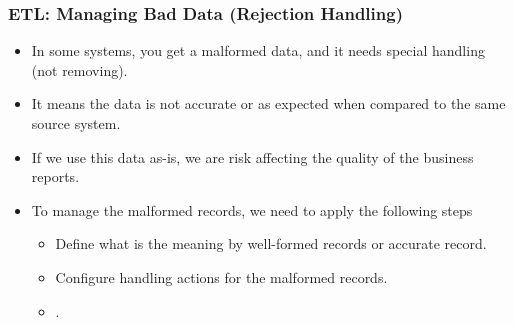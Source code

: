 
\begin{frame}
	\frametitle{ETL: Managing Bad Data (Rejection Handling)}
	\begin{itemize}[<+->]
		\item In some systems, you get a malformed data, and it needs special handling (not removing).
		\item It means the data is not accurate or as expected when compared to the same source system.
		\item If we use this data as-is, we are risk affecting the quality of the business reports.
		\item To manage the malformed records, we need to apply the following steps
		\begin{itemize}[<+->]
			\item  Define what is the meaning by well-formed records or accurate record.
			\item  Configure handling actions for the malformed records.
			\item  {}.

		\end{itemize}
	\end{itemize}
\end{frame}

